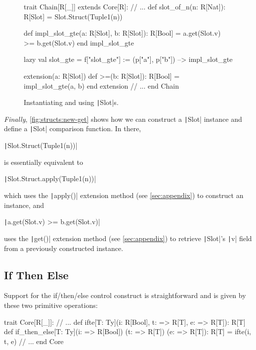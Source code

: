 \documentclass[11pt]{article}
\newcommand{\ScalaI}[1]{\texttt|#1|}
\newcommand{\FirstEtcX}[1]{\marginpar{\faCube{ \smaller #1}}\xspace}
\newcommand{\FirstEtc}{\FirstEtcX{}}
\begin{document}
\begin{figure}[tb]
\begin{ScalaBlock}
trait Chain[R[_]] extends Core[R]:
  // ...
  def slot_of_n(n: R[Nat]): R[Slot] =
    Slot.Struct(Tuple1(n))
  
  def impl_slot_gte(a: R[Slot], b: R[Slot]): R[Bool] =
    a.get(Slot.v) >= b.get(Slot.v)
  end impl_slot_gte

  lazy val slot_gte =
    f["slot_gte"] := (p["a"], p["b"]) --> impl_slot_gte

  extension(a: R[Slot])
    def >=(b: R[Slot]): R[Bool] = impl_slot_gte(a, b)
  end extension
  // ...
end Chain
\end{ScalaBlock}
\caption{Instantiating and using \ScalaI{Slot}s.}
\label{fig:structs:new-get}
\hrulefill
\end{figure}

\textit{Finally}\FirstEtc, \autoref{fig:structs:new-get} shows how we can 
construct a \ScalaI{Slot} instance and define a \ScalaI{Slot} comparison 
function. In there,

\ScalaI{Slot.Struct(Tuple1(n))}

\noindent is essentially equivalent to

\ScalaI{Slot.Struct.apply(Tuple1(n))}


\noindent which uses the \ScalaI{apply()} extension method (see \autoref{sec:appendix}) to construct an instance, and

\ScalaI{a.get(Slot.v) >= b.get(Slot.v)}

\noindent uses the \ScalaI{get()} extension method (see 
\autoref{sec:appendix}) to retrieve \ScalaI{Slot}'s \ScalaI{v} field from a 
previously constructed instance.


\subsection{If Then Else}
\label{sec:ifthenelse}

Support for the if/then/else control construct is straightforward and is 
given by these two primitive operations:

\begin{ScalaBlockSimple}
trait Core[R[_]]:
  // ...
  def ifte[T: Ty](i: R[Bool], t: => R[T], e: => R[T]): R[T]
  def if_then_else[T: Ty](i: => R[Bool])
                         (t: => R[T])
                         (e: => R[T]): R[T] = ifte(i, t, e)
  // ...
end Core
\end{ScalaBlockSimple}
\end{document}
